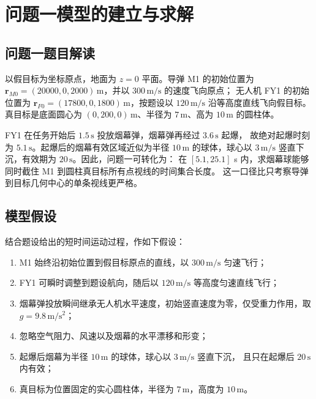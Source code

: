 \providecommand{\PoneReleasePoint}{(17620,\,0,\,1800)}
\providecommand{\PoneBurstTime}{5.1}
\providecommand{\PoneBurstPoint}{(17188,\,0,\,1736.496)}
\providecommand{\PoneFullStart}{8.056}
\providecommand{\PoneFullEnd}{9.448}
\providecommand{\PoneFullDuration}{1.392}
\providecommand{\PoneCentreStart}{8.013}
\providecommand{\PoneCentreEnd}{9.448}
\providecommand{\PoneCentreDuration}{1.435}
\providecommand{\PoneDurationDifference}{0.043}

\section{问题一模型的建立与求解}

\subsection{问题一题目解读}

以假目标为坐标原点，地面为 $z=0$ 平面。导弹 M1 的初始位置为
$\bm r_{M0}=(20000,0,2000)\,\mathrm m$，并以 $300\,\mathrm{m/s}$ 的速度飞向原点；
无人机 FY1 的初始位置为 $\bm r_{F0}=(17800,0,1800)\,\mathrm m$，按题设以
$120\,\mathrm{m/s}$ 沿等高度直线飞向假目标。真目标是底面圆心为
$(0,200,0)\,\mathrm m$、半径为 $7\,\mathrm m$、高为 $10\,\mathrm m$ 的圆柱体。

FY1 在任务开始后 $1.5\,\mathrm s$ 投放烟幕弹，烟幕弹再经过 $3.6\,\mathrm s$ 起爆，
故绝对起爆时刻为 $5.1\,\mathrm s$。起爆后的烟幕有效区域近似为半径 $10\,\mathrm m$
的球体，球心以 $3\,\mathrm{m/s}$ 竖直下沉，有效期为 $20\,\mathrm s$。因此，问题一可转化为：
在 $[5.1,25.1]$ s 内，求烟幕球能够同时截住 M1 到圆柱真目标所有点视线的时间集合长度。
这一口径比只考察导弹到目标几何中心的单条视线更严格。

\subsection{模型假设}

结合题设给出的短时间运动过程，作如下假设：

\begin{enumerate}
  \item M1 始终沿初始位置到假目标原点的直线，以 $300\,\mathrm{m/s}$ 匀速飞行；
  \item FY1 可瞬时调整到题设航向，随后以 $120\,\mathrm{m/s}$ 等高度匀速直线飞行；
  \item 烟幕弹投放瞬间继承无人机水平速度，初始竖直速度为零，仅受重力作用，取
  $g=9.8\,\mathrm{m/s^2}$；
  \item 忽略空气阻力、风速以及烟幕的水平漂移和形变；
  \item 起爆后烟幕为半径 $10\,\mathrm m$ 的球体，球心以 $3\,\mathrm{m/s}$ 竖直下沉，
  且只在起爆后 $20\,\mathrm s$ 内有效；
  \item 真目标为位置固定的实心圆柱体，半径为 $7\,\mathrm m$，高度为 $10\,\mathrm m$。
\end{enumerate}

